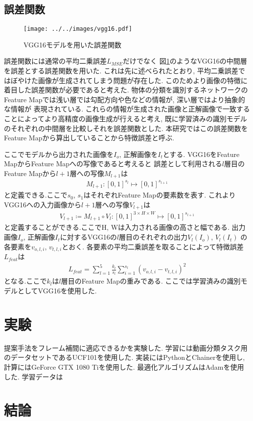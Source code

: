 \documentclass[twocolumn,a4j,uplatex]{jsarticle}
\begin{document}
\subsection{誤差関数}
\begin{figure}[htbp]
    \centering
    \texttt{[image: ../../images/vgg16.pdf]}
    \caption{VGG16モデルを用いた誤差関数}
    \label{fig:vgg16loss}
\end{figure}

誤差関数には通常の平均二乗誤差$L_{MSE}$だけでなく
図\ref{fig:vgg16loss}のようなVGG16\cite{VGG16}の中間層を誤差とする誤差関数を用いた.
これは先に述べられたとおり, 平均二乗誤差ではぼやけた画像が生成されてしまう問題が存在した.
このためより画像の特徴に着目した誤差関数が必要であると考えた.
物体の分類を識別するネットワークのFeature Mapでは浅い層では勾配方向や色などの情報が, 深い層ではより抽象的な情報が
表現されている. これらの情報が生成された画像と正解画像で一致することによってより高精度の画像生成が行えると考え,
既に学習済みの識別モデルのそれぞれの中間層を比較しそれを誤差関数とした.
本研究ではこの誤差関数をFeature Mapから算出していることから特徴誤差と呼ぶ.

ここでモデルから出力された画像を$I_o$, 正解画像を$I_t$とする.
VGG16をFeature MapからFeature Mapへの写像であると考えると
誤差として利用される$l$層目のFeature Mapから$l+1$層への写像$M_{l+1}$は
\begin{align}
    M_{l+1} : [0, 1]^{s_l} \mapsto [0, 1]^{s_{l+1}}
\end{align}
と定義できる.ここで$s_0$, $s_1$はそれぞれFeature Mapの要素数を表す.
これよりVGG16への入力画像から$l+1$層への写像$V_{l+1}$は
\begin{align}
    V_{l+1} \coloneqq M_{l+1} \circ V_l : [0, 1]^{3 \times H \times W} \mapsto [0, 1]^{s_{l+1}}
\end{align}
と定義することができる.ここでH, Wは入力される画像の高さと幅である.
出力画像$I_o$, 正解画像$I_t$に対するVGG16の$l$層目のそれぞれの出力$V_{l}(I_o)$, $V_{l}(I_t)$
の各要素を$v_{o,l,i}$, $v_{t,l,i}$とおく.
各要素の平均二乗誤差を取ることによって特徴誤差$L_{feat}$は
\begin{align}
    L_{feat} = \sum_{l=1}^5 \frac{k_l}{s_l} \sum_{i=1}^{s_l} (v_{o,l,i}-v_{t,l,i})^2
\end{align}
となる.ここで$k_l$は$l$層目のFeature Mapの重みである.
ここでは学習済みの識別モデルとしてVGG16\cite{VGG16}を使用した.

\section{実験}
提案手法をフレーム補間に適応できるかを実験した.
学習には動画分類タスク用のデータセットであるUCF101\cite{UCF101}を使用した.
実装にはPythonとChainer\cite{chainer_learningsys2015}を使用し, 計算にはGeForce GTX 1080 Tiを使用した.
最適化アルゴリズムはAdam\cite{kingma2014adam}を使用した.
学習データは

\section{結論}



\end{document}
